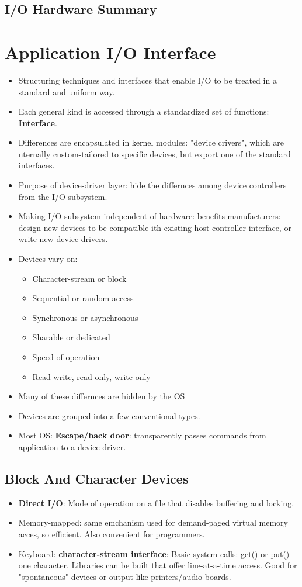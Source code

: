 \documentclass[10pt]{report}
\begin{document}
		\subsection{I/O Hardware Summary}

	\section{Application I/O Interface}
		\begin{itemize}
			\item Structuring techniques and interfaces that enable I/O to be treated in a standard and uniform way.
			\item Each general kind is accessed through a standardized set of functions: \textbf{Interface}.
			\item Differences are encapsulated in kernel modules: "device crivers", which are nternally custom-tailored to specific devices, but export one of the standard interfaces.
			\item Purpose of device-driver layer: hide the differnces among device controllers from the I/O subsystem.
			\item Making I/O subsystem independent of hardware: benefits manufacturers: design new devices to be compatible ith existing host controller interface, or write new device drivers.
			\item Devices vary on:
			\begin{itemize}
				\item Character-stream or block
				\item Sequential or random access
				\item Synchronous or asynchronous
				\item Sharable or dedicated
				\item Speed of operation
				\item Read-write, read only, write only
			\end{itemize}
			\item Many of these differnces are hidden by the OS
			\item Devices are grouped into a few conventional types.
			\item Most OS: \textbf{Escape/back door}: transparently passes commands from application to a device driver.
		\end{itemize}

		\subsection{Block And Character Devices}
			\begin{itemize}
				\item \textbf{Direct I/O}: Mode of operation on a file that disables buffering and locking.
				\item Memory-mapped: same emchanism used for demand-paged virtual memory acces, so efficient. Also convenient for programmers.
				\item Keyboard: \textbf{character-stream interface}: Basic system calls: get() or put() one character. Libraries can be built that offer line-at-a-time access. Good for "spontaneous" devices or output like printers/audio boards.
			\end{itemize}
\end{document}
